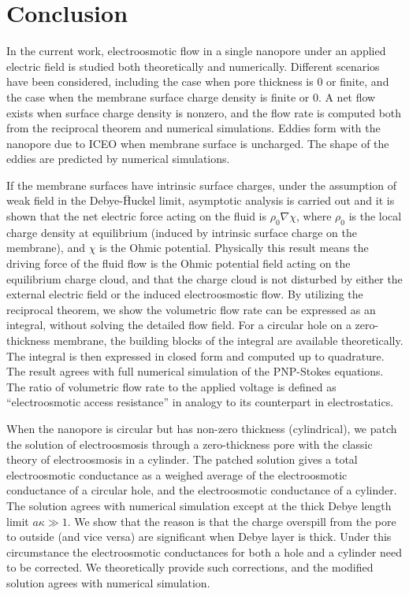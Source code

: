 \chapter{Conclusion}
In the current work, electroosmotic flow in a single nanopore under an applied electric field is studied both theoretically and numerically. Different scenarios have been considered, including the case when pore thickness is 0 or finite, and the case when the membrane surface charge density is finite or 0. A net flow exists when surface charge density is nonzero, and the flow rate is computed both from the reciprocal theorem and numerical simulations. Eddies form with the nanopore due to ICEO when membrane surface is uncharged. The shape of the eddies are predicted by numerical simulations.

If the membrane surfaces have intrinsic surface charges, under the assumption of weak field in the Debye-H\"{}uckel limit, asymptotic analysis is carried out and it is shown that the net electric force acting on the fluid is $\rho_0\nabla\chi$, where $\rho_0$ is the local charge density at equilibrium (induced by intrinsic surface charge on the membrane), and $\chi$ is the Ohmic potential. Physically this result means the driving force of the fluid flow is the Ohmic potential field acting on the equilibrium charge cloud, and that the charge cloud is not disturbed by either the external electric field or the induced electroosmostic flow. By utilizing the reciprocal theorem, we show the volumetric flow rate can be expressed as an integral, without solving the detailed flow field. For a circular hole on a zero-thickness membrane, the building blocks of the integral are available theoretically. The integral is then expressed in closed form and computed up to quadrature. The result agrees with full numerical simulation of the PNP-Stokes equations. The ratio of volumetric flow rate to the applied voltage is defined as ``electroosmotic access resistance'' in analogy to its counterpart in electrostatics.

When the nanopore is circular but has non-zero thickness (cylindrical), we patch the solution of electroosmosis through a zero-thickness pore with the classic theory of electroosmosis in a cylinder. The patched solution gives a total electroosmotic conductance as a weighed average of the electroosmotic conductance of a circular hole, and the electroosmotic conductance of a cylinder. The solution agrees with numerical simulation except at the thick Debye length limit $a\kappa \gg 1$. We show that the reason is that the charge overspill from the pore to outside (and vice versa) are significant when Debye layer is thick. Under this circumstance the electroosmotic conductances for both a hole and a cylinder need to be corrected. We theoretically provide such corrections, and the modified solution agrees with numerical simulation.

